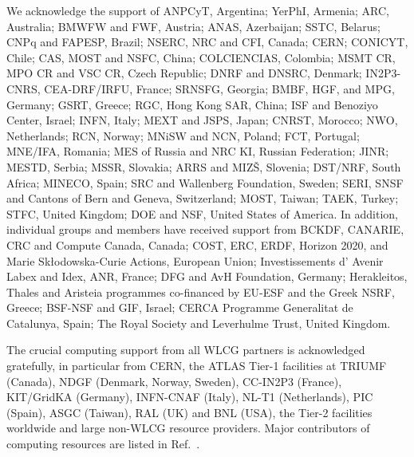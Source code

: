 \documentclass[PAPER, coverpage, atlasdraft=true, texlive=2016, UKenglish]{\ATLASLATEXPATH atlasdoc}
\begin{document}
We acknowledge the support of ANPCyT, Argentina; YerPhI, Armenia; ARC, Australia; BMWFW and FWF, Austria; ANAS, Azerbaijan; SSTC, Belarus; CNPq and FAPESP, Brazil; NSERC, NRC and CFI, Canada; CERN; CONICYT, Chile; CAS, MOST and NSFC, China; COLCIENCIAS, Colombia; MSMT CR, MPO CR and VSC CR, Czech Republic; DNRF and DNSRC, Denmark; IN2P3-CNRS, CEA-DRF/IRFU, France; SRNSFG, Georgia; BMBF, HGF, and MPG, Germany; GSRT, Greece; RGC, Hong Kong SAR, China; ISF and Benoziyo Center, Israel; INFN, Italy; MEXT and JSPS, Japan; CNRST, Morocco; NWO, Netherlands; RCN, Norway; MNiSW and NCN, Poland; FCT, Portugal; MNE/IFA, Romania; MES of Russia and NRC KI, Russian Federation; JINR; MESTD, Serbia; MSSR, Slovakia; ARRS and MIZ\v{S}, Slovenia; DST/NRF, South Africa; MINECO, Spain; SRC and Wallenberg Foundation, Sweden; SERI, SNSF and Cantons of Bern and Geneva, Switzerland; MOST, Taiwan; TAEK, Turkey; STFC, United Kingdom; DOE and NSF, United States of America. In addition, individual groups and members have received support from BCKDF, CANARIE, CRC and Compute Canada, Canada; COST, ERC, ERDF, Horizon 2020, and Marie Sk{\l}odowska-Curie Actions, European Union; Investissements d' Avenir Labex and Idex, ANR, France; DFG and AvH Foundation, Germany; Herakleitos, Thales and Aristeia programmes co-financed by EU-ESF and the Greek NSRF, Greece; BSF-NSF and GIF, Israel; CERCA Programme Generalitat de Catalunya, Spain; The Royal Society and Leverhulme Trust, United Kingdom. 

The crucial computing support from all WLCG partners is acknowledged gratefully, in particular from CERN, the ATLAS Tier-1 facilities at TRIUMF (Canada), NDGF (Denmark, Norway, Sweden), CC-IN2P3 (France), KIT/GridKA (Germany), INFN-CNAF (Italy), NL-T1 (Netherlands), PIC (Spain), ASGC (Taiwan), RAL (UK) and BNL (USA), the Tier-2 facilities worldwide and large non-WLCG resource providers. Major contributors of computing resources are listed in Ref.~\cite{ATL-GEN-PUB-2016-002}.


\end{document}
